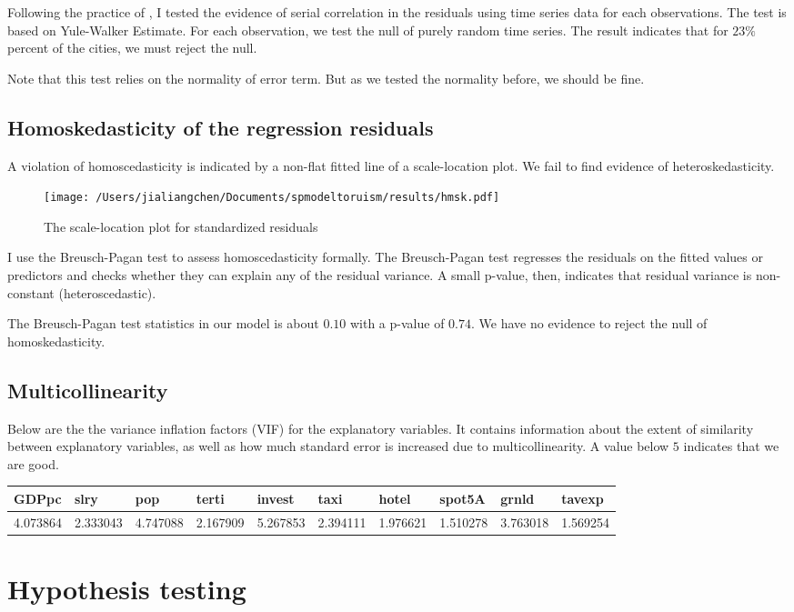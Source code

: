 \documentclass[11pt,a4paper]{amsart}
\theoremstyle{plain}
\theoremstyle{definition}
\begin{document}
Following the practice of \parencite{elhorstEvidencePoliticalYardstick2009a}, I tested the evidence of serial correlation in the residuals using time series data for each observations. The test is based on Yule-Walker Estimate. For each observation, we test the null of purely random time series. The result indicates that for $23\%$ percent of the cities, we must reject the null. 

Note that this test relies on the normality of error term. But as we tested the normality before, we should be fine. 

\subsection{Homoskedasticity of the regression residuals}\hfill\par
A violation of homoscedasticity is indicated by a non-flat fitted line of a scale-location plot.  We fail to find evidence of heteroskedasticity.

\begin{figure}[hbt]
	{\centering \texttt{[image: /Users/jialiangchen/Documents/spmodeltoruism/results/hmsk.pdf]}}
	\caption{The scale-location plot for standardized residuals}\label{F:hmsk}
\end{figure}

I use the Breusch-Pagan test to assess homoscedasticity formally. The Breusch-Pagan test regresses the residuals on the fitted values or predictors and checks whether they can explain any of the residual variance. A small p-value, then, indicates that residual variance is non-constant (heteroscedastic). 

The Breusch-Pagan test statistics in our model is about $0.10$ with a p-value of $0.74$. We have no evidence to reject the null of homoskedasticity.

\subsection{Multicollinearity}\hfill\par
Below are the the variance inflation factors (VIF) for the explanatory variables. It contains information about the extent of similarity between explanatory variables, as well as how much standard error is increased due to multicollinearity.  A value below $5$ indicates that we are good.
\begin{table}[H]
	\centering %
	\begin{tabularx}{\textwidth}{|X|X|X|X|X|X|X|X|X|X|}
		\hline
		GDPpc   &  slry    &  pop &   terti &  invest  &   taxi   &  hotel &  spot5A   &  grnld &  tavexp \\
	\hline
	4.073864& 2.333043  & 4.747088 & 2.167909 & 5.267853 & 2.394111 & 1.976621 & 1.510278 & 3.763018 & 1.569254 \\
		\hline
	\end{tabularx}
\end{table}

\section{Hypothesis testing}

\printbibliography
\end{document}
